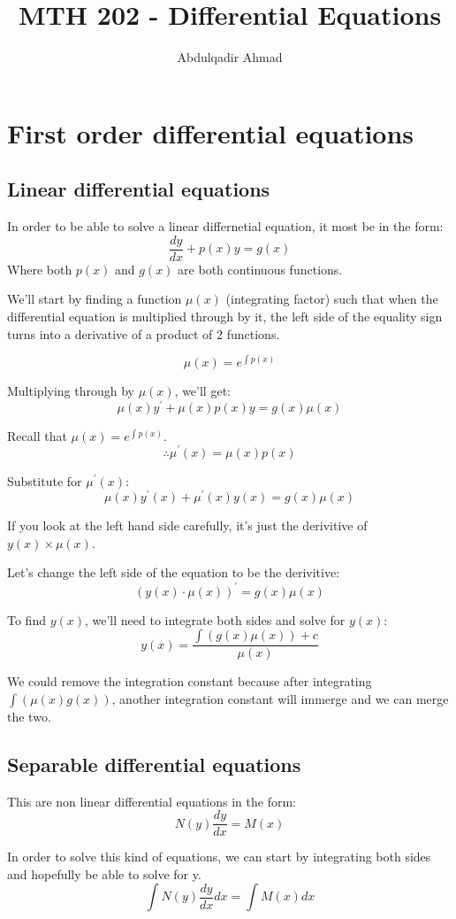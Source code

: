 \documentclass{book}
\title{MTH 202 {-} Differential Equations}
\author{Abdulqadir Ahmad}
\begin{document}
\maketitle
\tableofcontents

\chapter{First order differential equations}
\section{Linear differential equations}
In order to be able to solve a linear differnetial equation, it most be in the form:
\[\frac{dy}{dx} + p(x) y = g(x)\]
Where both \(p(x)\) and \(g(x)\) are both continuous functions.

We'll start by finding a function \(\mu(x)\) (integrating factor) such that when the differential equation is multiplied through by it, the left side of the equality sign turns into a derivative of a product of 2 functions.

\[\mu(x) = e^{\int p(x)}\]

Multiplying through by \(\mu(x)\), we'll get:
\[\mu(x) y^'	+ \mu(x) p(x) y = g(x) \mu(x)\]

Recall that \(\mu(x) = e^{\int p(x)}\).
\[\therefore \mu^'(x) = \mu(x) p(x)\]

Substitute for \(\mu^'(x)\):
\[\mu(x) y^'(x) + \mu^'(x) y(x) = g(x) \mu(x)\]

If you look at the left hand side carefully, it's just the derivitive of \(y (x)\times \mu(x)\).

Let's change the left side of the equation to be the derivitive:
\[{(y(x) \cdot \mu(x))}^' = g(x) \mu(x)\]

To find \(y(x)\), we'll need to integrate both sides and solve for \(y(x)\):
\[y(x) = \frac{\int (g(x) \mu(x)) + c}{\mu(x)}\]

We could remove the integration constant because after integrating \(\int (\mu(x) g(x))\), another integration constant will immerge and we can merge the two.

\section{Separable differential equations}
This are non linear differential equations in the form:
\[N(y) \frac{dy}{dx} = M(x)\]

In order to solve this kind of equations, we can start by integrating both sides and hopefully be able to solve for y.
\[\int N(y) \frac{dy}{dx} {dx} = \int M(x) {dx}\]
\end{document}

